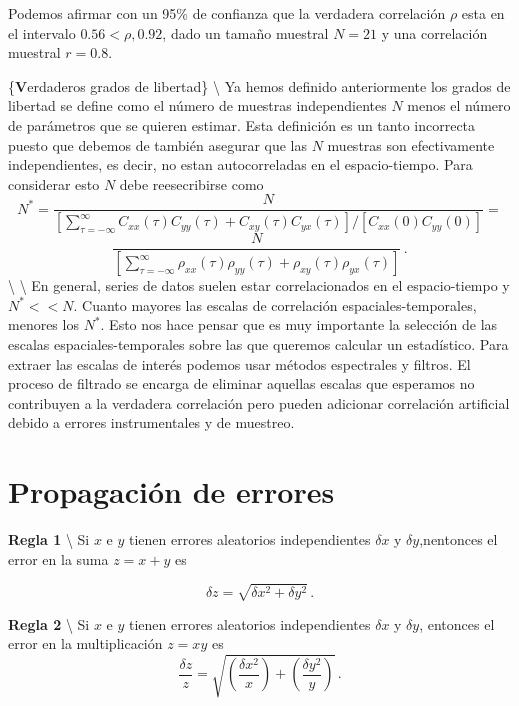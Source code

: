 \documentclass[
]{agujournal2019}
\begin{document}
\noindent Podemos afirmar con un 95\% de confianza que la verdadera
correlación \(\rho\) esta en el intervalo \(0.56<\rho,0.92\), dado un
tamaño muestral \(N=21\) y una correlación muestral \(r=0.8\).

\vspace{0.5cm}

\{\noindent \textbf Verdaderos grados de libertad\} \textbackslash{}
\noindent Ya hemos definido anteriormente los grados de libertad se
define como el número de muestras independientes \(N\) menos el número
de parámetros que se quieren estimar. Esta definición es un tanto
incorrecta puesto que debemos de también asegurar que las \(N\) muestras
son efectivamente independientes, es decir, no estan autocorreladas en
el espacio-tiempo. Para considerar esto \(N\) debe reesecribirse como
\[N^{*}=\frac{N}{\left[ \sum\limits^{\infty}_{\tau=-\infty}
C_{xx}(\tau)C_{yy}(\tau) + C_{xy}(\tau)C_{yx}(\tau)
\right]/\left[ C_{xx}(0)C_{yy}(0)\right]}=\]
\[\frac{N}{\left[\sum\limits^{\infty}_{\tau=-\infty}
               \rho_{xx}(\tau)\rho_{yy}(\tau) +
           \rho_{xy}(\tau)\rho_{yx}(\tau)\right]}\,.\] \textbackslash{}
\textbackslash{} \noindent En general, series de datos suelen estar
correlacionados en el espacio-tiempo y \(N^{*}<<N\). Cuanto mayores las
escalas de correlación espaciales-temporales, menores los \(N^*\). Esto
nos hace pensar que es muy importante la selección de las escalas
espaciales-temporales sobre las que queremos calcular un estadístico.
Para extraer las escalas de interés podemos usar métodos espectrales y
filtros. El proceso de filtrado se encarga de eliminar aquellas escalas
que esperamos no contribuyen a la verdadera correlación pero pueden
adicionar correlación artificial debido a errores instrumentales y de
muestreo.

\section{Propagación de errores}
\vspace{0.5cm}

\noindent \textbf {Regla 1} \textbackslash{} \noindent Si \(x\) e \(y\)
tienen errores aleatorios independientes \(\delta{x}\) y
\(\delta{y}\),nentonces el error en la suma \(z=x+y\) es

\[\delta{z}=\sqrt{\delta{x}^2 + \delta{y}^2}\,.\]

\vspace{0.5cm}

\noindent \textbf {Regla 2} \textbackslash{} \noindent Si \(x\) e \(y\)
tienen errores aleatorios independientes \(\delta{x}\) y \(\delta{y}\),
entonces el error en la multiplicación \(z=xy\) es
\[\frac{\delta{z}}{z}=\sqrt{\left(\frac{\delta{x}^2}{x}\right) + \left(\frac{\delta{y}^2}{y}\right)}\,.\]
\end{document}

